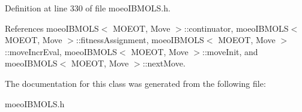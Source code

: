 Definition at line 330 of file moeo\-IBMOLS.h.

References moeo\-IBMOLS$<$ MOEOT, Move $>$::continuator, moeo\-IBMOLS$<$ MOEOT, Move $>$::fitness\-Assignment, moeo\-IBMOLS$<$ MOEOT, Move $>$::move\-Incr\-Eval, moeo\-IBMOLS$<$ MOEOT, Move $>$::move\-Init, and moeo\-IBMOLS$<$ MOEOT, Move $>$::next\-Move.

The documentation for this class was generated from the following file:\begin{CompactItemize}
\item 
moeo\-IBMOLS.h\end{CompactItemize}
